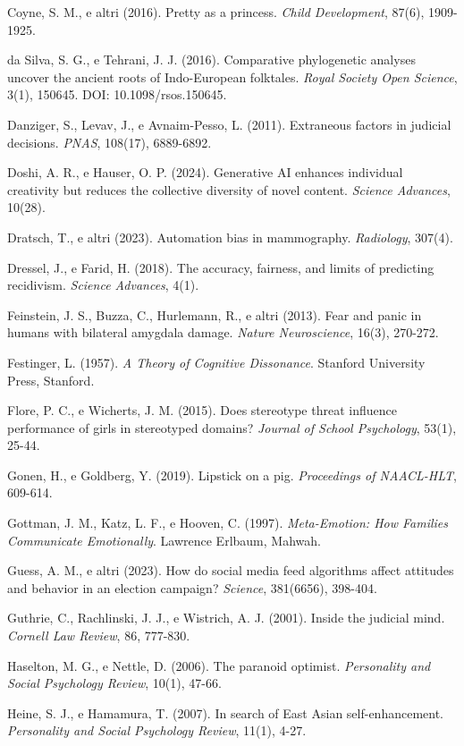 Coyne, S. M., e altri (2016). Pretty as a princess. \textit{Child Development}, 87(6), 1909-1925.

da Silva, S. G., e Tehrani, J. J. (2016). Comparative phylogenetic analyses uncover the ancient roots of Indo-European folktales. \textit{Royal Society Open Science}, 3(1), 150645. DOI: 10.1098/rsos.150645.

Danziger, S., Levav, J., e Avnaim-Pesso, L. (2011). Extraneous factors in judicial decisions. \textit{PNAS}, 108(17), 6889-6892.

Doshi, A. R., e Hauser, O. P. (2024). Generative AI enhances individual creativity but reduces the collective diversity of novel content. \textit{Science Advances}, 10(28).

Dratsch, T., e altri (2023). Automation bias in mammography. \textit{Radiology}, 307(4).

Dressel, J., e Farid, H. (2018). The accuracy, fairness, and limits of predicting recidivism. \textit{Science Advances}, 4(1).

Feinstein, J. S., Buzza, C., Hurlemann, R., e altri (2013). Fear and panic in humans with bilateral amygdala damage. \textit{Nature Neuroscience}, 16(3), 270-272.

Festinger, L. (1957). \textit{A Theory of Cognitive Dissonance}. Stanford University Press, Stanford.

Flore, P. C., e Wicherts, J. M. (2015). Does stereotype threat influence performance of girls in stereotyped domains? \textit{Journal of School Psychology}, 53(1), 25-44.

Gonen, H., e Goldberg, Y. (2019). Lipstick on a pig. \textit{Proceedings of NAACL-HLT}, 609-614.

Gottman, J. M., Katz, L. F., e Hooven, C. (1997). \textit{Meta-Emotion: How Families Communicate Emotionally}. Lawrence Erlbaum, Mahwah.

Guess, A. M., e altri (2023). How do social media feed algorithms affect attitudes and behavior in an election campaign? \textit{Science}, 381(6656), 398-404.

Guthrie, C., Rachlinski, J. J., e Wistrich, A. J. (2001). Inside the judicial mind. \textit{Cornell Law Review}, 86, 777-830.

Haselton, M. G., e Nettle, D. (2006). The paranoid optimist. \textit{Personality and Social Psychology Review}, 10(1), 47-66.

Heine, S. J., e Hamamura, T. (2007). In search of East Asian self-enhancement. \textit{Personality and Social Psychology Review}, 11(1), 4-27.

